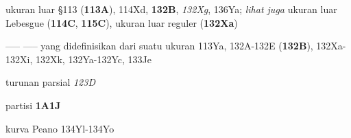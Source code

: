 



ukuran luar \S113 ({\bf 113A}), 114Xd, {\bf 132B}, {\it 132Xg},
136Ya;  
  {\it lihat juga} ukuran luar Lebesgue ({\bf 114C}, {\bf 115C}),
  ukuran luar reguler ({\bf 132Xa})

----- ----- yang didefinisikan dari suatu ukuran 113Ya,
132A-132E ({\bf 132B}), 
132Xa-132Xi, 
132Xk, 132Ya-132Yc, 
133Je














\indexmedskip
















turunan parsial {\it 123D}











partisi {\bf 1A1J}





kurva Peano 134Yl-134Yo 






















































